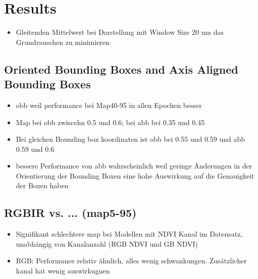 \chapter{Results}
\label{ch:results}

\begin{itemize}
    \item Gleitenden Mittelwert bei Darstellung mit Window Size 20 um das Grundrauschen zu minimieren
\end{itemize}
\section{Oriented Bounding Boxes and Axis Aligned Bounding Boxes}
\begin{itemize}
    \item obb weil performance bei Map40-95 in allen Epochen besser
    \item Map bei obb zwiscehn 0.5 und 0.6; bei abb bei 0.35 und 0.45
    \item Bei gleichen Bounding box koordinaten ist obb bei 0.55 und 0.59 und abb 0.59 und 0.6
    \item bessere Performance von abb wahrscheinlich weil geringe Änderungen in der Orientierung der Bounding Boxen eine hohe Auswirkung auf die Genauigkeit der Boxen haben
\end{itemize}

\section{RGBIR vs. ... (map5-95)}
\begin{itemize}
    \item Signifikant schlechtere map bei Modellen mit NDVI Kanal im Datensatz, unabhängig von Kanalanzahl (RGB NDVI und GB NDVI)
    \item RGB: Performance relativ ähnlich, alles wenig schwankungen. Zusätzlicher kanal hat wenig auswirkugnen
\end{itemize}
